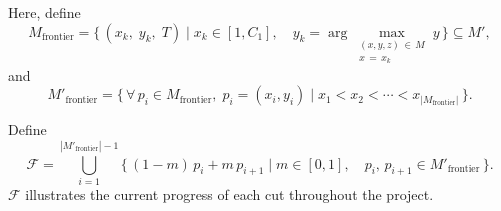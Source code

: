 \documentclass{article}
\begin{document}
Here, define
\[
    M_{\text{frontier}}
    = \bigl\{\,(x_k,\; y_k,\; T)
        \;\big|\;
        x_k \in [1, C_1],\quad
        y_k = \arg\max_{\substack{(x,y,z)\,\in\, M \\ x\,=\,x_k}} y
    \,\bigr\} \subseteq M',
\]
and
\[
    M'_{\text{frontier}}
    = \bigl\{\,\forall\, p_i \in M_{\text{frontier}},\;
        p_i = (x_i, y_i)
        \;\big|\;
        x_1 < x_2 < \cdots < x_{|M_{\text{frontier}}|}
    \,\bigr\}.
\]
 
Define
\[
    \mathcal{F}
    = \bigcup_{i=1}^{|M'_{\text{frontier}}| - 1}
      \bigl\{\,(1 - m)\,p_i + m\,p_{i+1}
          \;\big|\;
          m \in [0, 1],\quad p_i,\, p_{i+1} \in M'_{\text{frontier}}
      \,\bigr\}.
\]
$\mathcal{F}$ illustrates the current progress of each cut throughout the project.
\end{document}
